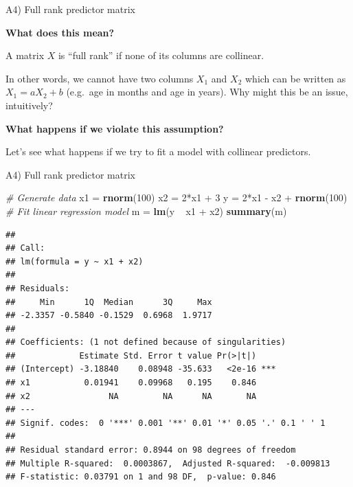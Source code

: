 \documentclass[12pt,ignorenonframetext,]{beamer}
\newenvironment{Shaded}{\begin{snugshade}}{\end{snugshade}}
\newcommand{\KeywordTok}[1]{\textcolor[rgb]{0.13,0.29,0.53}{\textbf{{#1}}}}
\newcommand{\DecValTok}[1]{\textcolor[rgb]{0.00,0.00,0.81}{{#1}}}
\newcommand{\StringTok}[1]{\textcolor[rgb]{0.31,0.60,0.02}{{#1}}}
\newcommand{\CommentTok}[1]{\textcolor[rgb]{0.56,0.35,0.01}{\textit{{#1}}}}
\newcommand{\NormalTok}[1]{{#1}}
\begin{document}
\begin{frame}{A4) Full rank predictor matrix}

\textbf{What does this mean?}

A matrix \(X\) is ``full rank'' if none of its columns are
\alert{collinear}.

In other words, we cannot have two columns \(X_1\) and \(X_2\) which can
be written as \(X_1 = aX_2 + b\) (e.g.~age in months and age in years).
Why might this be an issue, intuitively?

\pause

\textbf{What happens if we violate this assumption?}

Let's see what happens if we try to fit a model with collinear
predictors.

\end{frame}

\begin{frame}[fragile]{A4) Full rank predictor matrix}

\tiny

\begin{Shaded}
\begin{Highlighting}[]
\CommentTok{# Generate data}
\NormalTok{x1 =}\StringTok{ }\KeywordTok{rnorm}\NormalTok{(}\DecValTok{100}\NormalTok{)}
\NormalTok{x2 =}\StringTok{ }\DecValTok{2}\NormalTok{*x1 +}\StringTok{ }\DecValTok{3}
\NormalTok{y =}\StringTok{ }\DecValTok{2}\NormalTok{*x1 -}\StringTok{ }\NormalTok{x2 +}\StringTok{ }\KeywordTok{rnorm}\NormalTok{(}\DecValTok{100}\NormalTok{)}
\CommentTok{# Fit linear regression model}
\NormalTok{m =}\StringTok{ }\KeywordTok{lm}\NormalTok{(y ~}\StringTok{ }\NormalTok{x1 +}\StringTok{ }\NormalTok{x2)}
\KeywordTok{summary}\NormalTok{(m)}
\end{Highlighting}
\end{Shaded}

\begin{verbatim}
## 
## Call:
## lm(formula = y ~ x1 + x2)
## 
## Residuals:
##     Min      1Q  Median      3Q     Max 
## -2.3357 -0.5840 -0.1529  0.6968  1.9717 
## 
## Coefficients: (1 not defined because of singularities)
##             Estimate Std. Error t value Pr(>|t|)    
## (Intercept) -3.18840    0.08948 -35.633   <2e-16 ***
## x1           0.01941    0.09968   0.195    0.846    
## x2                NA         NA      NA       NA    
## ---
## Signif. codes:  0 '***' 0.001 '**' 0.01 '*' 0.05 '.' 0.1 ' ' 1
## 
## Residual standard error: 0.8944 on 98 degrees of freedom
## Multiple R-squared:  0.0003867,  Adjusted R-squared:  -0.009813 
## F-statistic: 0.03791 on 1 and 98 DF,  p-value: 0.846
\end{verbatim}

\normalsize

\end{frame}
\end{document}
